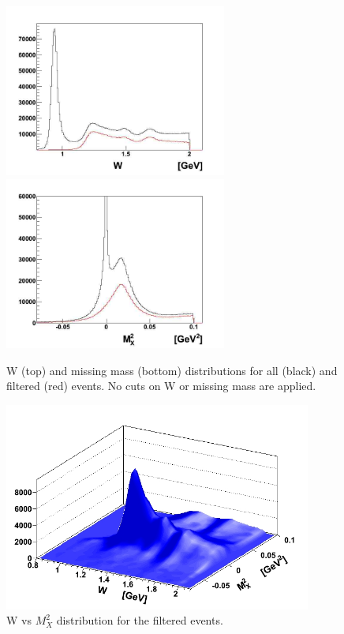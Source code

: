\begin{figure}[ht]
	\centering
		\includegraphics[width=0.65\textwidth]{img/W.jpg}
		\includegraphics[width=0.65\textwidth]{img/mm.jpg}
		\caption{W (top) and missing mass (bottom) distributions for all (black) and filtered (red) events. 
		No cuts on W or missing mass are applied. }
	\label{fig:wmm_pi0}
\end{figure}



\begin{figure}[hb]
	\centering
		\includegraphics[width=0.9\textwidth]{img/w_mm.jpg}
		\caption{W vs $M_X^2$ distribution for the filtered events.  }
	\label{fig:w_mm_pi0}
\end{figure}
\clearpage\newpage

